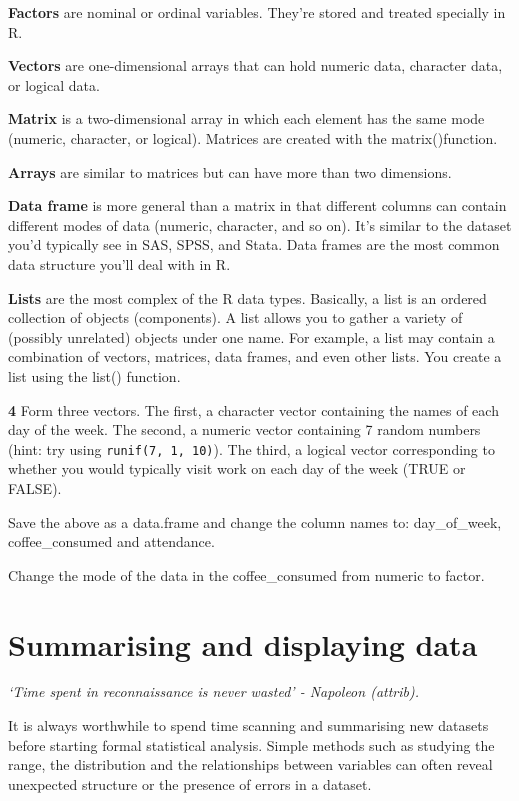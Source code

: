 \documentclass[
]{book}
\makeatletter
\newenvironment{kframe}{%
\medskip{}
\setlength{\fboxsep}{.8em}
 \def\at@end@of@kframe{}%
 \ifinner\ifhmode%
  \def\at@end@of@kframe{\end{minipage}}%
  \begin{minipage}{\columnwidth}%
 \fi\fi%
 \def\FrameCommand##1{\hskip\@totalleftmargin \hskip-\fboxsep
 \colorbox{shadecolor}{##1}\hskip-\fboxsep
     \hskip-\linewidth \hskip-\@totalleftmargin \hskip\columnwidth}%
 \MakeFramed {\advance\hsize-\width
   \@totalleftmargin\z@ \linewidth\hsize
   \@setminipage}}%
 {\par\unskip\endMakeFramed%
 \at@end@of@kframe}
\newenvironment{rmdblock}[1]
  {
  \begin{itemize}
  \renewcommand{\labelitemi}{
    \raisebox{-.7\height}[0pt][0pt]{
      {\setkeys{Gin}{width=3em,keepaspectratio}\texttt{[image: images/\#1]}}
    }
  }
  \setlength{\fboxsep}{1em}
  \begin{kframe}
  \item
  }
  {
  \end{kframe}
  \end{itemize}
  }
\newenvironment{rmdquiz}
  {\begin{rmdblock}{quiz}}
  {\end{rmdblock}}
\makeatother
\begin{document}
\textbf{Factors} are nominal or ordinal variables. They're stored and treated specially in R.

\textbf{Vectors} are one-dimensional arrays that can hold numeric data, character data, or logical data.

\textbf{Matrix} is a two-dimensional array in which each element has the same mode
(numeric, character, or logical). Matrices are created with the matrix()function.

\textbf{Arrays} are similar to matrices but can have more than two dimensions.

\textbf{Data frame} is more general than a matrix in that different columns can contain different modes of data (numeric, character, and so on). It's similar to the dataset you'd typically see in SAS, SPSS, and Stata. Data frames are the most common data structure you'll deal with in R.

\textbf{Lists} are the most complex of the R data types. Basically, a list is an ordered collection of objects (components). A list allows you to gather a variety of (possibly unrelated) objects under one name. For example, a list may contain a combination of vectors, matrices, data frames, and even other lists. You create a list using the list() function.

\begin{rmdquiz}
\textbf{4} Form three vectors. The first, a character vector containing the names of each day of the week. The second, a numeric vector containing 7 random numbers (hint: try using \texttt{runif(7,\ 1,\ 10)}). The third, a logical vector corresponding to whether you would typically visit work on each day of the week (TRUE or FALSE).

Save the above as a data.frame and change the column names to: day\_of\_week, coffee\_consumed and attendance.

Change the mode of the data in the coffee\_consumed from numeric to factor.\\
\end{rmdquiz}

\hypertarget{summarising-and-displaying-data}{%
\section{Summarising and displaying data}\label{summarising-and-displaying-data}}

\emph{`Time spent in reconnaissance is never wasted' - Napoleon (attrib).}

It is always worthwhile to spend time scanning and summarising new datasets before starting formal statistical analysis. Simple methods such as studying the range, the distribution and the relationships between variables can often reveal unexpected structure or the presence of errors in a dataset.
\end{document}
